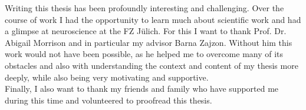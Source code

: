 \documentclass[
12pt, %
english, %
onehalfspacing, %
nolistspacing, %
headsepline, %
]{MastersDoctoralThesis} %
\begin{document}

\begin{acknowledgements}
\addchaptertocentry{\acknowledgementname} %
Writing this thesis has been profoundly interesting and challenging. Over the course of work I had the opportunity to learn much about scientific work and had a glimpse at neuroscience at the FZ Jülich. For this I want to thank Prof. Dr. Abigail Morrison and in particular my advisor Barna Zajzon. Without him this work would not have been possible, as he helped me to overcome many of its obstacles and also with understanding the context and content of my thesis more deeply, while also being very motivating and supportive.
\\
Finally, I also want to thank my friends and family who have supported me during this time and volunteered to proofread this thesis.
\end{acknowledgements}


\tableofcontents %

\listoffigures %




\mainmatter %

\pagestyle{thesis} %








\end{document}
